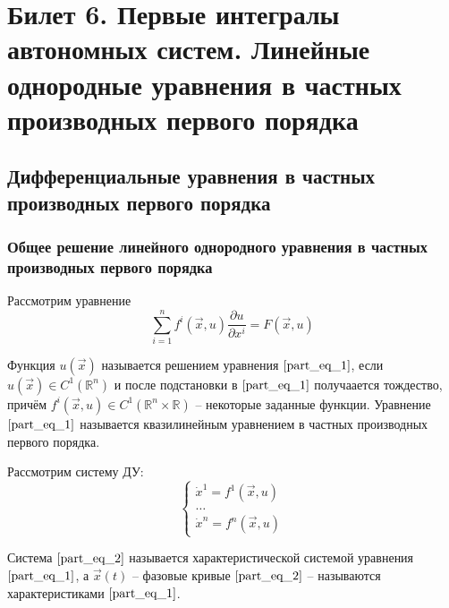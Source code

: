 
\section{Билет 6. Первые интегралы автономных систем. Линейные однородные уравнения в частных производных первого порядка}

\subsection{Дифференциальные уравнения в частных производных первого порядка}

\subsubsection{Общее решение линейного однородного уравнения в частных производных первого порядка}

\begin{definition}
    Рассмотрим уравнение
    \begin{equation}
        \sum \limits_{i = 1}^{n} f^{i} \left( \overrightarrow{x}, u \right) \frac{\partial u}{\partial x^{i}} = F \left( \overrightarrow{x}, u \right)
        \label{part_eq_1}
    \end{equation}

    Функция $u \left( \overrightarrow{x} \right)$ называется решением уравнения $\eqref{part_eq_1}$, если $u \left( \overrightarrow{x} \right) \in C^{1} \left( \mathbb{R}^n \right)$ и после подстановки в $\eqref{part_eq_1}$ получаается тождество, причём $f^{i} \left( \overrightarrow{x}, u \right) \in C^{1} \left( \mathbb{R}^n \times \mathbb{R} \right)$ -- некоторые заданные функции. Уравнение $\eqref{part_eq_1}$ называется квазилинейным уравнением в частных производных первого порядка. 
\end{definition}

\begin{definition}
    Рассмотрим систему ДУ:
    \begin{equation}
        \begin{cases}
            \dot{x}^1 = f^1 \left( \overrightarrow{x}, u \right) \\
            \dots                                                \\
            \dot{x}^n = f^n \left( \overrightarrow{x}, u \right)
        \end{cases}
        \label{part_eq_2}
    \end{equation}

    Система $\eqref{part_eq_2}$ называется характеристической системой уравнения $\eqref{part_eq_1}$, а $\overrightarrow{x} \left( t \right) $ -- фазовые кривые $\eqref{part_eq_2}$ -- называются характеристиками $\eqref{part_eq_1}$.
\end{definition}


